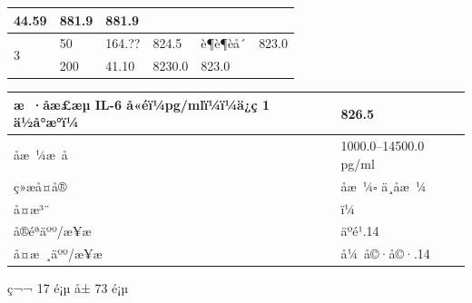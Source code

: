 \documentclass[UTF8,10pt,a4paper,fontset=fandol]{ctexart}
\newcommand{\fieldvalue}[1]{#1}
\newcommand{\handwritten}[1]{#1}
\begin{document}
\begin{tabular}{|p{}|p{}|p{}|p{}|p{}|p{}|}
\handwritten{44.59}
&
\handwritten{881.9}
&
\handwritten{881.9}
&
\\ \hline
\multirow{2}{*}{3}
&
\handwritten{50}
&
\handwritten{164.??}
&
\handwritten{824.5}
&
\handwritten{è¶è¶èå´}
&
\handwritten{823.0}
\\ \cline{2-6}
&
\handwritten{200}
&
\handwritten{41.10}
&
\handwritten{8230.0}
&
\handwritten{823.0}
&
\\ \hline
\end{tabular}

\normalsize

\begin{tabular}{|p{}|p{}|}
\hline
æ ·åæ£æµ IL-6 å«éï¼pg/mlï¼ï¼ä¿ç 1 ä½å°æ°ï¼ &
\fieldvalue{\handwritten{826.5}}
\\ \hline
åæ ¼æ å &
1000.0--14500.0\,pg/ml
\\ \hline
ç»æå¤å® &
\fieldvalue{åæ ¼}\quad $\square$ ä¸åæ ¼
\\ \hline
å¤æ³¨ &
\handwritten{ï¼}
\\ \hline
å®éªäºº/æ¥æ &
\fieldvalue{\handwritten{äºé¹\quad 2025.07.14}}
\\ \hline
å¤æ ¸äºº/æ¥æ &
\fieldvalue{\handwritten{å¼ å©·å©·\quad 2025.7.14}}
\\ \hline
\end{tabular}

\vfill

\begin{center}
ç¬¬ 17 é¡µ å± 73 é¡µ
\end{center}
\end{document}
